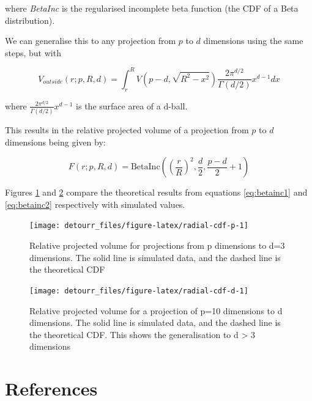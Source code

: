 where \emph{BetaInc} is the regularised incomplete beta function (the CDF of a Beta distribution).

We can generalise this to any projection from \(p\) to \(d\) dimensions using the same steps, but with

\begin{equation}
  V_{outside}(r; p, R, d) = \int_r^R V(p-d, \sqrt{R^2 - x^2}) 
  \frac{2\pi^{d/2}}{\Gamma(d/2)} x^{d-1} dx
\end{equation}

where \(\frac{2\pi^{d/2}}{\Gamma(d/2)} x^{d-1}\) is the surface area of a d-ball.

This results in the relative projected volume of a projection from \(p\) to \(d\) dimensions being given by:

\begin{equation}
F(r; p, R, d) = \mathrm{BetaInc}\left(\left(\frac{r}{R}\right)^2, \frac{d}{2}, \frac{p-d}{2}+1\right)
\label{eq:betainc2}
\end{equation}

Figures \ref{fig:radial-cdf-p} and \ref{fig:radial-cdf-d} compare the theoretical results from equations \eqref{eq:betainc1} and \eqref{eq:betainc2} respectively with simulated values.

\begin{figure}

{\centering \texttt{[image: detourr\_files/figure-latex/radial-cdf-p-1]} 

}

\caption{Relative projected volume for projections from p dimensions to d=3 dimensions. The solid line is simulated data, and the dashed line is the theoretical CDF}\label{fig:radial-cdf-p}
\end{figure}

\begin{figure}

{\centering \texttt{[image: detourr\_files/figure-latex/radial-cdf-d-1]} 

}

\caption{Relative projected volume for a projection of p=10 dimensions to d dimensions.  The solid line is simulated data, and the dashed line is the theoretical CDF. This shows the generalisation to d > 3 dimensions}\label{fig:radial-cdf-d}
\end{figure}

\hypertarget{references}{%
\section*{References}\label{references}}

